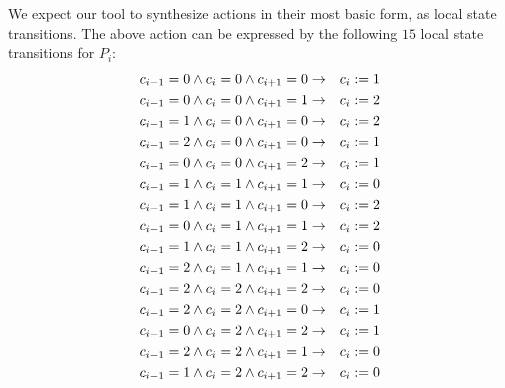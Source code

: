 We expect our tool to synthesize actions in their most basic form, as local state transitions.
The above action can be expressed by the following $15$ local state transitions for $P_i$:
\begin{eqnarray*}
 c_{i-1} = 0 \wedge c_i = 0 \wedge c_{i+1} = 0 & \to & c_i := 1 \\
 c_{i-1} = 0 \wedge c_i = 0 \wedge c_{i+1} = 1 & \to & c_i := 2 \\
 c_{i-1} = 1 \wedge c_i = 0 \wedge c_{i+1} = 0 & \to & c_i := 2 \\
 c_{i-1} = 2 \wedge c_i = 0 \wedge c_{i+1} = 0 & \to & c_i := 1 \\
 c_{i-1} = 0 \wedge c_i = 0 \wedge c_{i+1} = 2 & \to & c_i := 1 \\
 c_{i-1} = 1 \wedge c_i = 1 \wedge c_{i+1} = 1 & \to & c_i := 0 \\
 c_{i-1} = 1 \wedge c_i = 1 \wedge c_{i+1} = 0 & \to & c_i := 2 \\
 c_{i-1} = 0 \wedge c_i = 1 \wedge c_{i+1} = 1 & \to & c_i := 2 \\
 c_{i-1} = 1 \wedge c_i = 1 \wedge c_{i+1} = 2 & \to & c_i := 0 \\
 c_{i-1} = 2 \wedge c_i = 1 \wedge c_{i+1} = 1 & \to & c_i := 0 \\
 c_{i-1} = 2 \wedge c_i = 2 \wedge c_{i+1} = 2 & \to & c_i := 0 \\
 c_{i-1} = 2 \wedge c_i = 2 \wedge c_{i+1} = 0 & \to & c_i := 1 \\
 c_{i-1} = 0 \wedge c_i = 2 \wedge c_{i+1} = 2 & \to & c_i := 1 \\
 c_{i-1} = 2 \wedge c_i = 2 \wedge c_{i+1} = 1 & \to & c_i := 0 \\
 c_{i-1} = 1 \wedge c_i = 2 \wedge c_{i+1} = 2 & \to & c_i := 0
\end{eqnarray*}







